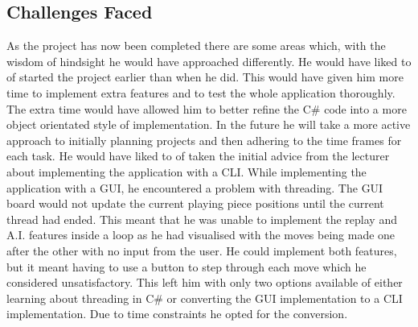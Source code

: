 \documentclass[10pt, a4paper]{article}
\begin{document}
 \subsection{Challenges Faced}
 As the project has now been completed there are some areas which, with the wisdom of hindsight he would have approached differently. 
 \newline 
 He would have liked to of started the project earlier than when he did. This would have given him more time to implement extra features and to test the whole application thoroughly. The extra time would have allowed him to better refine the C\# code into a more object orientated style of implementation. In the future he will take a more active approach to initially planning projects and then adhering to the time frames for each task.
 \newline
 He would have liked to of taken the initial advice from the lecturer about implementing the application with a CLI. While implementing the application with a GUI, he encountered a problem with threading. The GUI board would not update the current playing piece positions until the current thread had ended. This meant that he was unable to implement the replay and A.I. features inside a loop as he had visualised with the moves being made one after the other with no input from the user. He could implement both features, but it meant having to use a button to step through each move which he considered unsatisfactory. This left him with only two options available of either learning about threading in C\# or converting the GUI implementation to a CLI implementation. Due to time constraints he opted for the conversion.
 \newline
 
\end{document}
